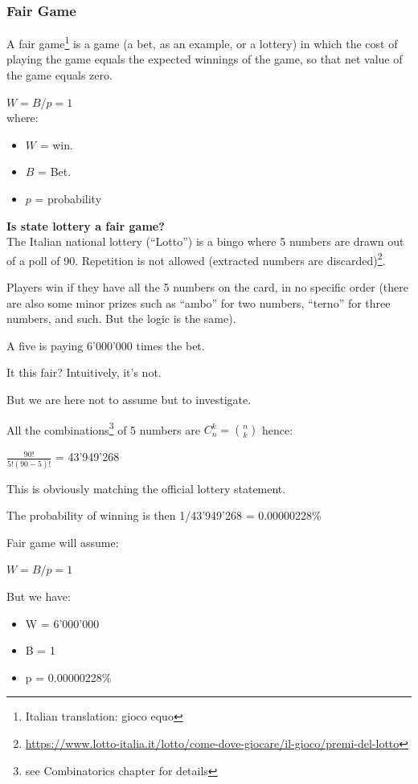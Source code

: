 \documentclass{article}
\begin{document}
\subsubsection{Fair Game}
A fair game\footnote{Italian translation: gioco equo} is a game (a bet, as an example, or a lottery) in which the cost of playing the game equals the expected winnings of the game, so that net value of the game equals zero.

$W = B/p = 1$ 
\mbox{} \\
where:
\begin{itemize}
    \item $W$ = win.
    \item $B$ = Bet.
    \item $p$ = probability
\end{itemize}




\textbf{Is state lottery a fair game?}\\ 
The Italian national lottery (“Lotto”) is a bingo where 5 numbers are drawn out of a poll of 90. Repetition is not allowed (extracted numbers are discarded)\footnote{\url{https://www.lotto-italia.it/lotto/come-dove-giocare/il-gioco/premi-del-lotto}}. 

Players win if they have all the 5 numbers on the card, in no specific order (there are also some minor prizes such as “ambo” for two numbers, “terno” for three numbers, and such. But the logic is the same).

A five is paying 6’000’000 times the bet.

It this fair? Intuitively, it’s not. 

But we are here not to assume but to investigate.

All the combinations\footnote{see Combinatorics chapter for details} of 5 numbers are $ \displaystyle C _n ^k = \binom{n}{k}$ hence:

$\frac{90!}{5!(90 - 5)!}$ = 43’949’268 

This is obviously matching the official lottery statement.

The probability of winning is then 1/43’949’268 = 0.00000228\%

Fair game will assume: 

$W = B/p = 1$

But we have:
\begin{itemize}
    \item W = 6’000’000
    \item B = 1
    \item p = 0.00000228\%
\end{itemize}
\end{document}

